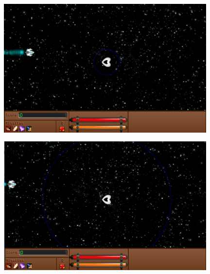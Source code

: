 \begin{itemize}
\begin{itemize}
				\end{itemize}
				\begin{center}
					\par \includegraphics[width=11cm]{images/vaisseaux/support_little.png}
					\par \includegraphics[width=11cm]{images/vaisseaux/support_huge.png}
				\end{center}

				\par~
		\end{itemize}